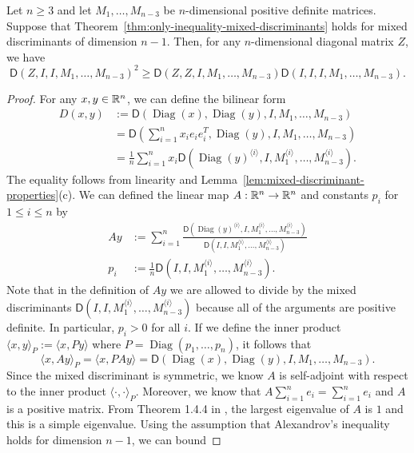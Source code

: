 \documentclass{puthesis-UG}
\begin{document}
\begin{lem} \label{lem:reduced-inequality}
	Let $n \geq 3$ and let $M_1, \ldots, M_{n-3}$ be $n$-dimensional positive definite matrices. Suppose that Theorem~\ref{thm:only-inequality-mixed-discriminants} holds for mixed discriminants of dimension $n-1$. Then, for any $n$-dimensional diagonal matrix $Z$, we have 
	\[
		\mathsf{D} (Z, I, I, M_1, \ldots, M_{n-3} )^2 \geq \mathsf{D}(Z, Z, I, M_1, \ldots, M_{n-3}) \mathsf{D} (I, I, I, M_1, \ldots, M_{n-3}).
	\]
\end{lem}

\begin{proof}
	For any $x, y \in \mathbb{R}^n$, we can define the bilinear form 
	\begin{align*}
		D(x, y) & := \mathsf{D} (\operatorname{Diag}(x), \operatorname{Diag}(y), I, M_1, \ldots, M_{n-3} ) \\
		& = \mathsf{D} \left ( \sum_{i = 1}^n x_i e_ie_i^T, \operatorname{Diag}(y), I, M_1, \ldots, M_{n-3} \right ) \\
		& = \frac{1}{n} \sum_{i = 1}^n x_i \mathsf{D} \left ( \operatorname{Diag}(y)^{\langle i \rangle}, I, M_1^{\langle i \rangle}, \ldots, M_{n-3}^{\langle i \rangle} \right ).
	\end{align*}
	The equality follows from linearity and Lemma~\ref{lem:mixed-discriminant-properties}(c). We can defined the linear map $A : \mathbb{R}^n \to \mathbb{R}^n$ and constants $p_i$ for $1 \leq i \leq n$ by
	\begin{align*}
		Ay & :=  \sum_{i = 1}^n \frac{\mathsf{D}(\operatorname{Diag}(y)^{\langle i \rangle}, I, M_1^{\langle i \rangle}, \ldots, M_{n-3}^{\langle i \rangle})}{\mathsf{D}(I, I, M_1^{\langle i \rangle}, \ldots, M_{n-3}^{\langle i \rangle})} \\
		p_i & := \frac{1}{n} \mathsf{D} (I, I, M_1^{\langle i \rangle}, \ldots, M_{n-3}^{\langle i \rangle}).
	\end{align*}
	Note that in the definition of $Ay$ we are allowed to divide by the mixed discriminants $\mathsf{D}(I, I, M_1^{\langle i \rangle}, \ldots, M_{n-3}^{\langle i \rangle})$ because all of the arguments are positive definite. In particular, $p_i > 0$ for all $i$. If we define the inner product $\langle x, y \rangle_P := \langle x, P y \rangle$ where $P = \operatorname{Diag}(p_1, \ldots, p_n)$, it follows that 
	\[
		\langle x, Ay \rangle_P = \langle x, PA y \rangle = \mathsf{D}(\operatorname{Diag}(x), \operatorname{Diag}(y), I, M_1, \ldots, M_{n-3} ).
	\]
	Since the mixed discriminant is symmetric, we know $A$ is self-adjoint with respect to the inner product $\langle \cdot, \cdot \rangle_P$. Moreover, we know that $A \sum_{i = 1}^n e_i = \sum_{i = 1}^n e_i$ and $A$ is a positive matrix. From Theorem 1.4.4 in \cite{bapat_raghavan_1997}, the largest eigenvalue of $A$ is $1$ and this is a simple eigenvalue. Using the assumption that Alexandrov's inequality holds for dimension $n-1$, we can bound

\end{proof}
\end{document}
